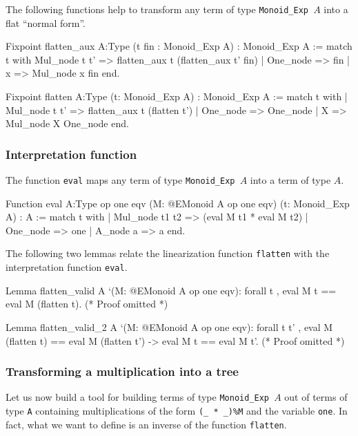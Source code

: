 The following functions help to transform any term of type
\texttt{Monoid\_Exp $A$} into a flat ``normal form''.

\begin{Coqsrc}

Fixpoint flatten_aux {A:Type} (t fin : Monoid_Exp A) 
  : Monoid_Exp A :=
match t with Mul_node  t t' =>
              flatten_aux t (flatten_aux t' fin)
           | One_node  => fin
           |  x => Mul_node  x fin
end.

Fixpoint flatten {A:Type} (t: Monoid_Exp A) : Monoid_Exp A :=
match t with
| Mul_node t t' => flatten_aux t (flatten t')
| One_node => One_node
| X => Mul_node X One_node
end.
\end{Coqsrc}

\subsubsection{Interpretation function}

The function \texttt{eval} maps any term of type \texttt{Monoid\_Exp $A$}
into a term of type \texttt{$A$}.

\begin{Coqsrc}
Function eval {A:Type} {op one eqv}
         (M: @EMonoid A op one eqv)
         (t: Monoid_Exp A) : A :=
 match t with 
            | Mul_node t1 t2 => (eval M t1 * eval M t2)%
            | One_node => one
            | A_node a => a
end.
\end{Coqsrc}

The following two lemmas relate the linearization function \texttt{flatten}
with the interpretation function \texttt{eval}.

\begin{Coqsrc}
Lemma flatten_valid {A} `(M: @EMonoid A op one eqv):
forall t , eval M t == eval M (flatten t).
(* Proof omitted *) 

Lemma flatten_valid_2 {A} `(M: @EMonoid A op one eqv):
forall t t' , eval  M (flatten t) == eval M (flatten t')  ->
     eval M t == eval M t'.
(* Proof omitted *)
\end{Coqsrc}

\subsubsection{Transforming a multiplication into a tree}
Let us now build a tool for building terms of type  \texttt{Monoid\_Exp $A$} out
of terms of type \texttt{A} containing multiplications of the form 
\Verb|(_ * _)%
In fact, what we want to  define is an inverse of the function \texttt{flatten}.


